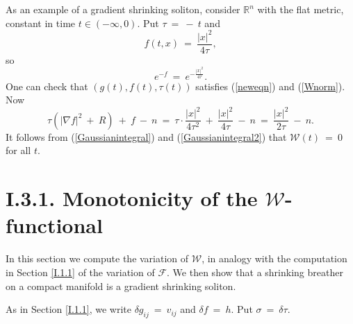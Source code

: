 \documentclass[12pt]{amsart}
\newcommand{\R}{{\mathbb R}}
\numberwithin{equation}{section}
\theoremstyle{plain}
\theoremstyle{definition}
\theoremstyle{remark}
\begin{document}
As an example of a gradient shrinking soliton,
consider $\R^n$ with the flat metric, constant in time
$t \in (-\infty, 0)$. Put $\tau \: = \: - \: t$ and
\begin{equation}
f(t, x) \: = \: \frac{|x|^2}{4\tau},
\end{equation}
so
\begin{equation}
e^{-f} \: = \: e^{- \frac{|x|^2}{4\tau}}.
\end{equation}
One can check that $(g(t), f(t), \tau(t))$ satisfies 
(\ref{neweqn}) and (\ref{Wnorm}).
Now
\begin{equation}
\tau ( |\nabla f|^2 \: + \: R) \: + \: f \: - \: n \: = \:
\tau \cdot \frac{|x|^2}{4 \tau^2} \: + \: \frac{|x|^2}{4\tau} \: - \: n
\: = \:  \frac{|x|^2}{2\tau} \: - \: n.
\end{equation}
It follows from (\ref{Gaussianintegral}) and (\ref{Gaussianintegral2}) 
that ${\mathcal W}(t) \: = \: 0$ for all $t$.

\section{I.3.1. Monotonicity of the ${\mathcal W}$-functional}

In this section
we compute the variation of ${\mathcal W}$, in analogy with
the computation in Section \ref{I.1.1} of the variation of ${\mathcal F}$.
We then show that a shrinking breather on a compact manifold
is a gradient shrinking soliton.

As in Section \ref{I.1.1}, we write $\delta g_{ij} \: = \: v_{ij}$ and $\delta f \: = \: h$.
Put $\sigma \: = \: \delta \tau$. 
\end{document}
